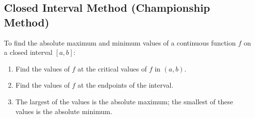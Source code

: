 \subsection*{Closed Interval Method (Championship Method)}

To find the absolute maximum and minimum values of a continuous function \(f\) on a closed interval \([a, b]\):
\begin{enumerate}
    \item Find the values of \(f\) at the critical values of \(f\) in \((a, b)\).
    \item Find the values of \(f\) at the endpoints of the interval.
    \item The largest of the values is the absolute maximum; the smallest of these values is the absolute minimum.
\end{enumerate}
